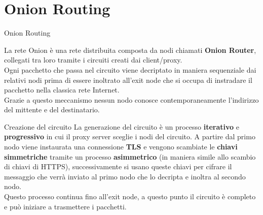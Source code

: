 \section{Onion Routing}
\begin{frame}{Onion Routing}
    \begin{figure}[htpb!]
        \centering
        
    \end{figure}
    La rete Onion è una rete distribuita composta da nodi chiamati \textbf{Onion Router}, collegati tra loro tramite i circuiti creati dai client/proxy. \\
    Ogni pacchetto che passa nel circuito viene decriptato in maniera sequenziale dai relativi nodi prima di essere inoltrato all'exit node che si occupa di instradare il pacchetto nella classica rete Internet. \\ 
    Grazie a questo meccanismo nessun nodo conosce contemporaneamente l'indirizzo del mittente e del destinatario.


\end{frame}

\begin{frame}
    
\end{frame}

\begin{frame}{Creazione del circuito}
    La generazione del circuito è un processo \textbf{iterativo} e \textbf{progressivo} in cui il proxy server sceglie i nodi del circuito. A partire dal primo nodo viene instaurata una connessione \textbf{TLS} e vengono scambiate le \textbf{chiavi simmetriche} tramite un processo \textbf{asimmetrico} (in maniera simile allo scambio di chiavi di HTTPS), successivamente si usano queste chiavi per cifrare il messaggio che verrà inviato al primo nodo che lo decripta e inoltra al secondo nodo. \\
    Questo processo continua fino all'exit node, a questo punto il circuito è completo e può iniziare a trasmettere i pacchetti.
\end{frame}
    
\begin{frame}
    \begin{figure}[htpb!]
        \centering
        
    \end{figure}
\end{frame}